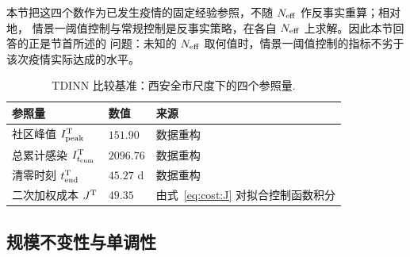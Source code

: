 \documentclass[lang=cn,a4paper,newtx]{elegantpaper}
\numberwithin{equation}{section}
\theoremstyle{plain}
\newcommand{\Itcum}{I_{t_{\mathrm{cum}}}}
\begin{document}
本节把这四个数作为已发生疫情的固定经验参照，不随 $N_{\rm eff}$ 作反事实重算；相对地，
情景一阈值控制与常规控制是反事实策略，在各自 $N_{\rm eff}$ 上求解。因此本节回答的正是节首所述的
问题：未知的 $N_{\rm eff}$ 取何值时，情景一阈值控制的指标不劣于该次疫情实际达成的水平。

\begin{table}[htbp]
  \centering
  \footnotesize
  \caption{TDINN 比较基准：西安全市尺度下的四个参照量.}
  \label{tab:dom:tdinn}
  \begin{tabular}{lll}
    \toprule
    参照量 & 数值 & 来源 \\
    \midrule
    社区峰值 $I_{\rm peak}^{\rm T}$ & $151.90$ & 数据重构 \\
    总累计感染 $\Itcum^{\rm T}$ & $2096.76$ & 数据重构 \\
    清零时刻 $t_{\rm end}^{\rm T}$ & $45.27$ d & 数据重构 \\
    二次加权成本 $J^{\rm T}$ & $49.35$ & 由式~\eqref{eq:cost:J} 对拟合控制函数积分 \\
    \bottomrule
  \end{tabular}
\end{table}

\subsection{规模不变性与单调性}
\label{sec:dom:theory}
\end{document}

